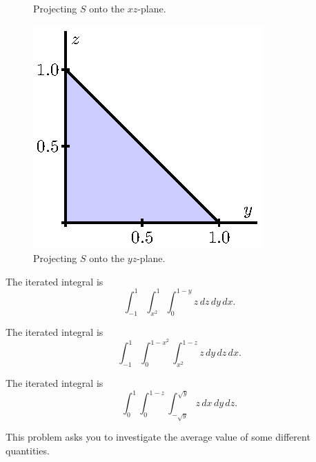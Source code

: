 \begin{exercises}
\begin{figure}[ht]
\begin{center}
\begin{minipage}{1.75in}
\begin{center}
\end{center}
\caption{Projecting $S$ onto the $xz$-plane.}
\label{F:11.7.TI_Example_2_xz}
\end{minipage} \hspace{0.1in}
\begin{minipage}{1.75in}
\begin{center}
  \includegraphics{figures/fig_11_7_solid_proj_3.eps}
\end{center}
\caption{Projecting $S$ onto the $yz$-plane.}
\label{F:11.7.TI_Example_2_yz}
\end{minipage}
\end{center}
\end{figure}

\begin{exerciseSolution}
    \ba
    \item The iterated integral is 
\[\int_{-1}^{1} \int_{x^2}^{1} \int_{0}^{1-y} z \, dz \, dy \, dx.\]

    \item The iterated integral is 
\[\int_{-1}^{1} \int_{0}^{1-x^2} \int_{x^2}^{1-z} z \, dy \, dz \, dx.\]

	\item The iterated integral is 
\[\int_{0}^{1} \int_{0}^{1-z} \int_{-\sqrt{y}}^{\sqrt{y}} z \, dx \, dy \, dz.\]

	\ea
\end{exerciseSolution}

\item This problem asks you to investigate the average value of some different quantities.


\end{exercises}
